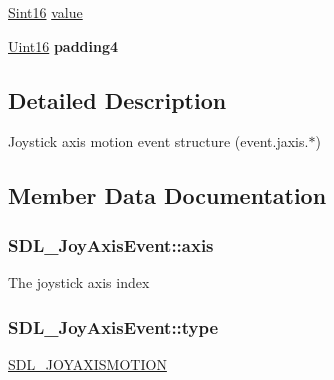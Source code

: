 \begin{DoxyCompactItemize}
\item 
\hyperlink{_s_d_l__stdinc_8h_a9d0257032c0e146ab6121bf0122712f5}{Sint16} \hyperlink{struct_s_d_l___joy_axis_event_a53ee73e7c367934dd6edb69963be5556}{value}
\item 
\hypertarget{struct_s_d_l___joy_axis_event_a604b258940a8cd8beaa5efeb55d6f825}{}\hyperlink{_s_d_l__stdinc_8h_a31fcc0a076c9068668173ee26d33e42b}{Uint16} {\bfseries padding4}\label{struct_s_d_l___joy_axis_event_a604b258940a8cd8beaa5efeb55d6f825}

\end{DoxyCompactItemize}


\subsection{Detailed Description}
Joystick axis motion event structure (event.\+jaxis.$\ast$) 

\subsection{Member Data Documentation}
\hypertarget{struct_s_d_l___joy_axis_event_a0beac2fb161e45771c424bd0b6daeabb}{}
\subsubsection[{axis}]{ S\+D\+L\+\_\+\+Joy\+Axis\+Event\+::axis}\label{struct_s_d_l___joy_axis_event_a0beac2fb161e45771c424bd0b6daeabb}
The joystick axis index \hypertarget{struct_s_d_l___joy_axis_event_aed1c873fb90ba58194e65f972933c67d}{}
\subsubsection[{type}]{ S\+D\+L\+\_\+\+Joy\+Axis\+Event\+::type}\label{struct_s_d_l___joy_axis_event_aed1c873fb90ba58194e65f972933c67d}
\hyperlink{_s_d_l__events_8h_a3b589e89be6b35c02e0dd34a55f3fccaaf0803b3f8a12de3d85f81ebd7b514cd1}{S\+D\+L\+\_\+\+J\+O\+Y\+A\+X\+I\+S\+M\+O\+T\+I\+O\+N} \hypertarget{struct_s_d_l___joy_axis_event_a53ee73e7c367934dd6edb69963be5556}{}
